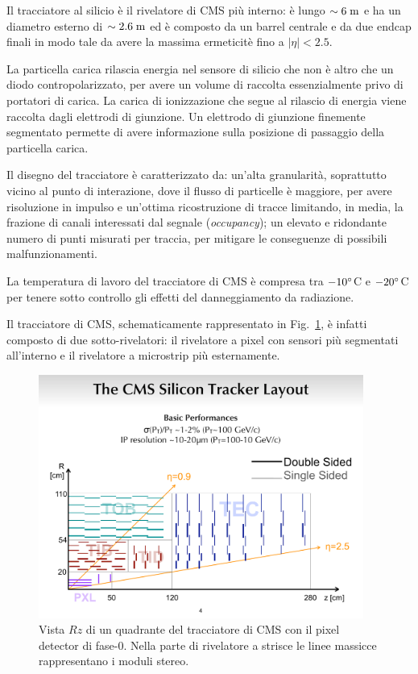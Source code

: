Il tracciatore al silicio \`e il rivelatore di CMS pi\`u interno: \`e lungo $\sim6\rm \; m$ e ha un diametro esterno di $\sim 2.6\rm \; m$ ed \`e composto da un barrel centrale e da due endcap finali in modo tale da avere la massima ermeticit\`e fino a $|\eta|<2.5$.

La particella carica rilascia energia nel sensore di silicio che non \`e altro che un diodo contropolarizzato, per avere un volume di raccolta essenzialmente privo di portatori di carica. La carica di ionizzazione che segue al rilascio di energia viene raccolta dagli elettrodi di giunzione. Un elettrodo di giunzione finemente segmentato permette di avere informazione sulla posizione di passaggio della particella carica.

Il disegno del tracciatore \`e caratterizzato da: un’alta granularit\`a, soprattutto vicino al punto di interazione, dove il flusso di particelle \`e maggiore, per avere risoluzione in impulso e un'ottima ricostruzione di tracce limitando, in media, la frazione di canali interessati dal segnale ({\em occupancy}); un elevato e ridondante numero di punti misurati per traccia, per mitigare le conseguenze di possibili malfunzionamenti.

La temperatura di lavoro del tracciatore di CMS \`e compresa tra $-10^\circ$C e $-20^\circ$C per tenere sotto controllo gli effetti del danneggiamento da radiazione.
  
Il tracciatore di CMS, schematicamente rappresentato in Fig.~\ref{fig:CMSTk}, \`e infatti composto di due sotto-rivelatori: il rivelatore a pixel con sensori pi\`u segmentati all'interno e il rivelatore a microstrip pi\`u esternamente. 
  
\begin{figure}
\centering
\includegraphics[width=0.95\textwidth]{Immagini/layout_rz.pdf}
\caption{Vista $Rz$ di un quadrante del tracciatore di CMS con il pixel detector di fase-0. Nella parte di rivelatore a strisce le linee massicce rappresentano i moduli stereo.}
\label{fig:CMSTk}
\end{figure}

